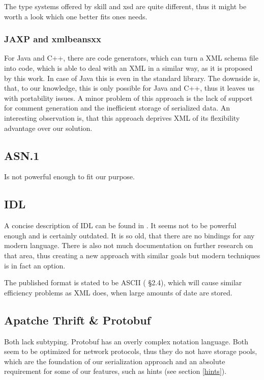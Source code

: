 The type systems offered by \gls{skill} and \gls{xsd} are quite different, thus it might be worth a look which one better fits ones needs.

\subsubsection*{JAXP and xmlbeansxx}

For Java and C++, there are code generators, which can turn a XML schema file into code, which is able to deal with an XML in a similar way, as it is proposed by this work. In case of Java this is even in the standard library. The downside is, that, to our knowledge, this is only possible for Java and C++, thus it leaves us with portability issues. A minor problem of this approach is the lack of support for comment generation and the inefficient storage of serialized data.
An interesting observation is, that this approach deprives XML of its flexibility advantage over our solution.


\subsection*{ASN.1}

Is not powerful enough to fit our purpose.


\subsection*{IDL}

A concise description of IDL can be found in \cite{lamb87}. It seems not to be powerful enough and is certainly outdated. It is so old, that there are no bindings for any modern language. There is also not much documentation on further research on that area, thus creating a new approach with similar goals but modern techniques is in fact an option.

The published format is stated to be ASCII (\cite{lamb87} §2.4), which will cause similar efficiency problems as XML does, when large amounts of date are stored.


\subsection*{Apatche Thrift \& Protobuf}

Both lack subtyping. Protobuf has an overly complex notation language. Both seem to be optimized for network protocols, thus they do not have storage pools, which are the foundation of our serialization approach and an absolute requirement for some of our features, such as hints (see section \ref{hints}).


